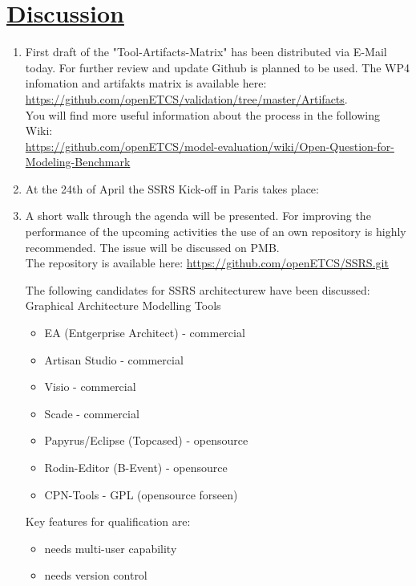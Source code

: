 \documentclass[a4paper]{article}
\begin{document}
\section*{\underline{Discussion}}
\begin{enumerate}
\item First draft of the "Tool-Artifacts-Matrix"
has been distributed via E-Mail today. For further review and update Github is planned to be used. The WP4 infomation and artifakts matrix is available here:\\
\url{https://github.com/openETCS/validation/tree/master/Artifacts}.\\
You will find more useful information about the process in the following Wiki:\\
\url{https://github.com/openETCS/model-evaluation/wiki/Open-Question-for-Modeling-Benchmark}

\item At the 24th of April the SSRS Kick-off in Paris takes place:
\item A short walk through the agenda will be presented.
For improving the performance of the upcoming activities the use of an own repository is highly recommended. The issue will be discussed on PMB.\\
The repository is available here:
\url{https://github.com/openETCS/SSRS.git}

The following candidates for SSRS architecturew have been discussed:\\
Graphical Architecture Modelling Tools
\begin{itemize}
\item EA (Entgerprise Architect) - commercial
\item Artisan Studio    - commercial
\item Visio      - commercial
\item Scade      - commercial
\item Papyrus/Eclipse (Topcased) - opensource
\item Rodin-Editor (B-Event)  - opensource
\item CPN-Tools     - GPL (opensource forseen)
\end{itemize}

Key features for qualification are:
\begin{itemize}
\item  needs multi-user capability
\item  needs version control
\end{itemize}


\end{enumerate}
\end{document}
